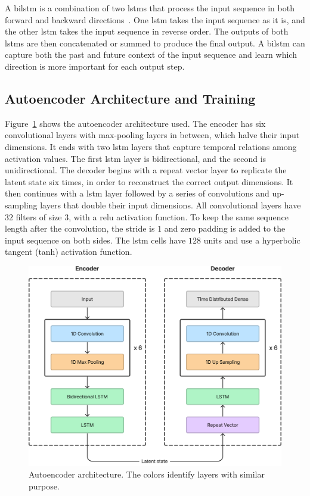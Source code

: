 A \acrfull{bilstm} is a combination of two \acrshort{lstm}s that process the input sequence in both forward and backward directions~\parencite{schuster_bidirectional_1997}. One \acrshort{lstm} takes the input sequence as it is, and the other \acrshort{lstm} takes the input sequence in reverse order. The outputs of both \acrshort{lstm}s are then concatenated or summed to produce the final output. A \acrshort{bilstm} can capture both the past and future context of the input sequence and learn which direction is more important for each output step.

\subsection{Autoencoder Architecture and Training}

Figure~\ref{fig:autoencoder_architecture} shows the autoencoder architecture used. The encoder has six convolutional layers with max-pooling layers in between, which halve their input dimensions. It ends with two \acrshort{lstm} layers that capture temporal relations among activation values. The first \acrshort{lstm} layer is bidirectional, and the second is unidirectional. The decoder begins with a repeat vector layer to replicate the latent state six times, in order to reconstruct the correct output dimensions. It then continues with a \acrshort{lstm} layer followed by a series of convolutions and up-sampling layers that double their input dimensions. All convolutional layers have $32$ filters of size $3$, with a \acrfull{relu} activation function. To keep the same sequence length after the convolution, the stride is $1$ and zero padding is added to the input sequence on both sides. The \acrshort{lstm} cells have $128$ units and use a hyperbolic tangent (tanh) activation function.

\begin{figure}
    \centering
    \includegraphics[width=.8\linewidth]{images/autoencoder.png}
    \caption{Autoencoder architecture. The colors identify layers with similar purpose.}
    \label{fig:autoencoder_architecture}
\end{figure}

